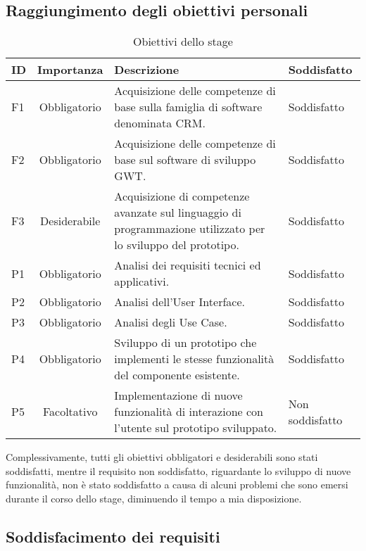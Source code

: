 \subsection{Raggiungimento degli obiettivi personali}
\begin{table}[h]
	\centering
	\caption{Obiettivi dello stage}
	\label{tab:obiettivi-raggiunti}
	\begin{tabular}{|l|c|p{7cm}|p{4cm}|}
		\hline
		\rule[-4mm]{0mm}{1cm}
		ID & Importanza & Descrizione & Soddisfatto\\
		\hline
		\rule[-3mm]{0mm}{0.8cm}
		F1 & Obbligatorio & Acquisizione delle competenze di base sulla famiglia di software denominata CRM. & Soddisfatto\\
		\hline
		\rule[-3mm]{0mm}{0.8cm}
		F2 & Obbligatorio & Acquisizione delle competenze di base sul software di sviluppo GWT. & Soddisfatto\\
		\hline
		\rule[-3mm]{0mm}{0.8cm}
		F3 & Desiderabile & Acquisizione di competenze avanzate sul linguaggio di programmazione utilizzato per lo sviluppo del prototipo. & Soddisfatto\\
		\hline
		\rule[-3mm]{0mm}{0.8cm}
		P1 & Obbligatorio & Analisi dei requisiti tecnici ed applicativi. & Soddisfatto\\
		\hline
		\rule[-3mm]{0mm}{0.8cm}
		P2 & Obbligatorio & Analisi dell'User Interface. & Soddisfatto\\
		\hline
		\rule[-3mm]{0mm}{0.8cm}
		P3 & Obbligatorio & Analisi degli Use Case. & Soddisfatto\\
		\hline
		\rule[-3mm]{0mm}{0.8cm}
		P4 & Obbligatorio & Sviluppo di un prototipo che implementi le stesse funzionalità del componente esistente. & Soddisfatto\\
		\hline
		\rule[-3mm]{0mm}{0.8cm}
		P5 & Facoltativo & Implementazione di nuove funzionalità di interazione con l'utente sul prototipo sviluppato. & Non soddisfatto\\
		\hline
	\end{tabular}
\end{table}
Complessivamente, tutti gli obiettivi obbligatori e desiderabili sono stati soddisfatti, mentre il requisito non soddisfatto, riguardante lo sviluppo di nuove funzionalità, non è stato soddisfatto a causa di alcuni problemi che sono emersi durante il corso dello stage, diminuendo il tempo a mia disposizione.\\

\subsection{Soddisfacimento dei requisiti}

